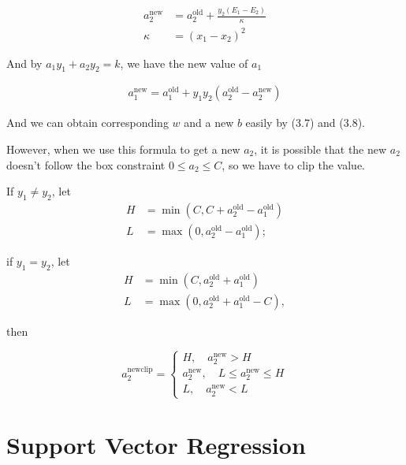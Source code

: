 \documentclass[a4paper]{report}
\begin{document}
\begin{align}
    a_2^{\mathrm{new}} &= a_2^{\mathrm{old}}+\frac{y_2(E_1-E_2)}{\kappa} \\
    \kappa &=(x_1-x_2)^2
\end{align}

And by $a_1y_1+a_2y_2=k$, we have the new value of $a_1$

\begin{align}
    a_1^{\mathrm{new}}=a_1^{\mathrm{old}}+ y_1y_2(a_2^{\mathrm{old}}- a_2^{\mathrm{new}})
\end{align}

And we can obtain corresponding $w$ and a new $b$ easily by (3.7) and (3.8).

%

However, when we use this formula to get a new $a_2$, it is possible that the new $a_2$ doesn't follow the box constraint $0\leq a_2\leq C$, so we have to clip the value.

If $y_1\neq y_2$, let 
\begin{align*}
    H&=\min(C,C+a_2^{\mathrm{old}}-a_1^{\mathrm{old}}) \\
    L&=\max(0,a_2^{\mathrm{old}}-a_1^{\mathrm{old}});
\end{align*}

if $y_1=y_2$,  let 
\begin{align*}
    H&=\min(C,a_2^{\mathrm{old}}+a_1^{\mathrm{old}}) \\
    L&=\max(0,a_2^{\mathrm{old}}+a_1^{\mathrm{old}}-C),
\end{align*}

then

\[
    a_2^{\mathrm{new clip}} = 
    \begin{cases}
        H, \quad a_2^{\mathrm{new}}>H \\
        a_2^{\mathrm{new}}, \quad L\leq a_2^{\mathrm{new}} \leq H \\
        L, \quad a_2^{\mathrm{new}} <L
    \end{cases}
\]

\section{Support Vector Regression}
\end{document}
